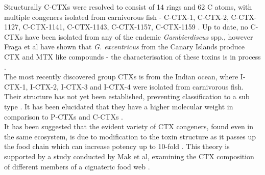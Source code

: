 \documentclass[12pt]{article}
\begin{document}
Structurally C-CTXs were resolved to consist of 14 rings and 62 C atoms, with multiple congeners isolated from carnivorous fish - C-CTX-1, C-CTX-2, C-CTX-1127, C-CTX-1141, C-CTX-1143, C-CTX-1157, C-CTX-1159 \cite{vernoux1997isolation,lewis1998structure,pottier2003identification,pottier2002characterisation}. Up to date, no C-CTXs have been isolated from any of the endemic \emph{Gambierdiscus} spp., however Fraga et al have shown that \emph{G. excentricus} from the Canary Islands produce CTX and MTX like compounds - the characterisation of these toxins is in process \cite{fraga2011gambierdiscus}. \\
The most recently discovered group CTXs is from the Indian ocean, where I-CTX-1, I-CTX-2, I-CTX-3 and I-CTX-4 were isolated from carnivorous fish. Their structure has not yet been established, preventing classification to a sub type \cite{hamilton2002multiple,hamilton2002isolation}. It has been elucidated that they have a higher molecular weight in comparison to P-CTXs and C-CTXs \cite{caillaud2010update,hamilton2002multiple,hamilton2002isolation}. \\ %

It has been suggested that the evident variety of CTX congeners, found even in the same ecosystem, is due to modification to the toxin structure as it passes up the food chain which can increase potency up to 10-fold \cite{hokama1996human,lewis2006ciguatera}. This theory is supported by a study conducted by Mak et al, examining the CTX composition of different members of a ciguateric food web \cite{mak2013pacific}.

\end{document}
